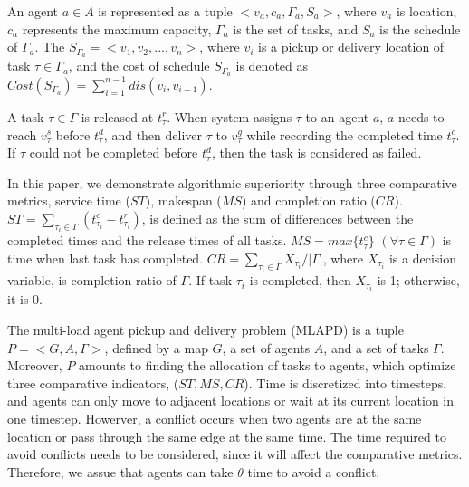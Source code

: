 \documentclass[sigconf,anonymous]{aamas}
\begin{document}

\begin{definition}[Agent]
\label{AgentDfn}
    An agent $a \in A$ is represented as a tuple $<v_{a}, c_{a}, \Gamma_{a}, S_{a}>$, 
    where $v_{a}$ is location, $c_{a}$ represents the maximum capacity, 
    $\Gamma_{a}$ is the set of tasks, and $S_{a}$ is the schedule of $\Gamma_{a}$. 
    The $S_{\Gamma_{a}} = <v_{1}, v_{2},..., v_{n}>$, 
    where $v_{i}$ is a pickup or delivery location of task $\tau \in \Gamma_{a}$,
    and the cost of schedule $S_{\Gamma_{a}}$ is denoted as 
    $Cost(S_{\Gamma_{a}}) = \sum^{n-1}_{i=1}{dis(v_i, v_{i+1})}$.
\end{definition}

A task $\tau \in \Gamma$ is released at $t^{r}_{\tau}$. 
When system assigns $\tau$ to an agent $a$, 
$a$ needs to reach $v^{s}_{\tau}$ before $t^{d}_{\tau}$, 
and then deliver $\tau$ to $v^g_{\tau}$ while recording the completed time $t^{c}_{\tau}$. 
If $\tau$ could not be completed before $t^{d}_{\tau}$, 
then the task is considered as failed.

\begin{definition}
    In this paper, we demonstrate algorithmic superiority through three comparative metrics, 
    service time (${ST}$), makespan ($MS$) and completion ratio ($CR$). 
    $ST = \sum_{\tau_i \in \Gamma}{(t^{c}_{\tau_i} - t^{r}_{\tau_i})}$, 
    is defined as the sum of differences between the completed times and the release times of all tasks.
    $MS = max{\{t^{c}_{\tau}\}}$ $(\forall \tau \in \Gamma)$ 
    is time when last task has completed.
    $CR = {\sum_{\tau_i \in \Gamma}{X_{\tau_i}}}/{|\Gamma|}$, 
    where $X_{\tau_i}$ is a decision variable, is completion ratio of $\Gamma$. 
    If task $\tau_{i}$ is completed, then $X_{\tau_i}$ is 1; otherwise, it is 0.
       
\end{definition}

\begin{definition}[MLAPD]
\label{ProDfn}
    The multi-load agent pickup and delivery problem (MLAPD) is a tuple $P = <G, A, \Gamma>$, 
    defined by a map $G$, a set of agents $A$, and a set of tasks $\Gamma$. 
    Moreover, $P$ amounts to finding the allocation of tasks to agents, 
    which optimize three comparative indicators, ($ST, MS, CR$).
    Time is discretized into timesteps, and agents can only move to adjacent locations 
    or wait at its current location in one timestep.
    Howerver, a conflict occurs when two agents are at the same location or pass through the same edge at the same time.
    The time required to avoid conflicts needs to be considered, since it will affect the comparative metrics.
    Therefore, we assue that agents can take $\theta$ time to avoid a conflict.
\end{definition}
 
\end{document}

